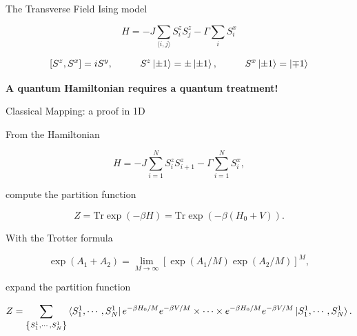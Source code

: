 \documentclass[aspectratio=169, xcolor=dvipsnames]{beamer}
\begin{document}
\begin{frame}{The Transverse Field Ising model}
	
	\begin{equation*}
		H = -J\sum_{\langle i,j\rangle} S_i^zS_j^z - \Gamma\sum_i S_i^x	
	\end{equation*}


	\begin{equation*}
		\left[S^z,S^x\right] = iS^y,\hspace{1cm} S^z\ket{\pm 1} = \pm\ket{\pm 1},\hspace{1cm} S^x\ket{\pm 1} = \ket{\mp 1}
	\end{equation*}

	\vspace{1cm}
	\centering
	\textbf{A quantum Hamiltonian requires a quantum treatment!}

\end{frame}


\begin{frame}{Classical Mapping: a proof in 1D}

	From the Hamiltonian
		
	\begin{equation*}
		H = -J\sum_{i=1}^N S_i^zS_{i+1}^z - \Gamma\sum_{i=1}^N S_i^x,		
	\end{equation*}

	compute the partition function

	\begin{equation*}
		Z = \mathrm{Tr}\exp\left(-\beta H\right) = \mathrm{Tr}\exp\left(-\beta\left(H_0+V\right)\right).
	\end{equation*}
	
	With the Trotter formula \cite{trotter}
		
	\begin{equation*}
		\exp\left(A_1+A_2\right) = \lim_{M\to\infty}\left[\exp\left(A_1/M\right)\exp\left(A_2/M\right)\right]^M,
	\end{equation*}
		
	expand the partition function
	
	\begin{equation*}
		Z = \sum_{\left\{S^1_1,\cdots,S^1_N\right\}}\bra{S^1_1,\cdots,S^1_N}e^{-\beta H_0/M}e^{-\beta V/M}\times\cdots\times e^{-\beta H_0/M}e^{-\beta V/M}\ket{S^1_1,\cdots,S^1_N}.
	\end{equation*}

\end{frame}
\end{document}
